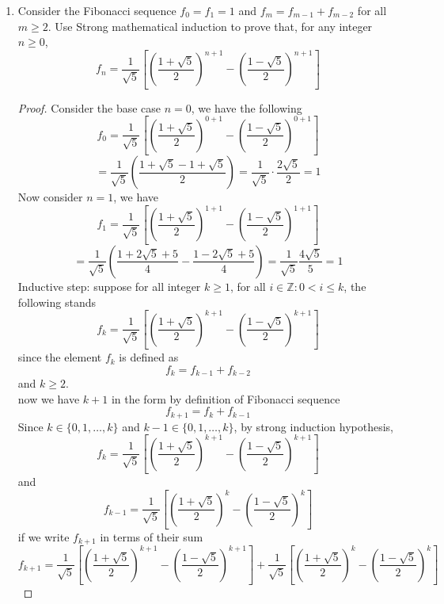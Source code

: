 \documentclass[12pt]{article}
\newcommand{\Z}{\mathbb{Z}}
\newcommand{\sqbkt}[1]{\left[ #1 \right]}
\newcommand{\paren}[1]{\left( #1 \right)}
\begin{document}
\begin{enumerate}
    \item Consider the Fibonacci sequence $f_0 = f_1 = 1$ and $f_m = f_{m-1} + f_{m-2}$ for all $m \geq 2$. Use Strong mathematical induction to prove that, for any integer $n \geq 0$, 
        \[
        f_n = \frac{1}{\sqrt{5}}\sqbkt{\paren{\frac{1+\sqrt{5}}{2}}^{n+1} - \paren{\frac{1-\sqrt{5}}{2}}^{n+1}}
        \]
        \begin{proof}
            Consider the base case $n=0$, we have the following
                \[
                f_0=\frac{1}{\sqrt{5}}\sqbkt{\paren{\frac{1+\sqrt{5}}{2}}^{0+1} - \paren{\frac{1-\sqrt{5}}{2}}^{0+1}} 
                \]
                \[
                = \frac{1}{\sqrt{5}}\paren{\frac{1+\sqrt{5}-1+\sqrt{5}}{2}} = \frac{1}{\sqrt{5}}\cdot\frac{2\sqrt{5}}{2} = 1
                \]
            Now consider $n=1$, we have
                \[
                f_1=\frac{1}{\sqrt{5}}\sqbkt{\paren{\frac{1+\sqrt{5}}{2}}^{1+1} - \paren{\frac{1-\sqrt{5}}{2}}^{1+1}} 
                \]
                \[
                =\frac{1}{\sqrt{5}} \paren{
                \frac{1 + 2\sqrt{5} + 5 }{4}-
                \frac{1 - 2\sqrt{5} + 5 }{4}
                }=\frac{1}{\sqrt{5}}\frac{4\sqrt{5}}{5} = 1
                \]
            Inductive step: suppose for all integer $k \geq 1$, for all $i \in \Z : 0 < i \leq k$, the following stands
                \[
                f_k = \frac{1}{\sqrt{5}}\sqbkt{\paren{\frac{1+\sqrt{5}}{2}}^{k+1} - \paren{\frac{1-\sqrt{5}}{2}}^{k+1}}
                \]
            since the element $f_k$ is defined as
                \[
                f_k = f_{k-1}+ f_{k-2}
                \]
            and $k \geq 2$.\\
            now we have $k+1$ in the form by definition of Fibonacci sequence
                \[
                f_{k+1} = f_{k}+f_{k-1}
                \]
            Since $k \in \{0,1,\ldots,k \}$ and $k-1 \in \{0,1,\ldots,k \}$, by strong induction hypothesis,
                \[
                f_k = \frac{1}{\sqrt{5}}\sqbkt{\paren{\frac{1+\sqrt{5}}{2}}^{k+1} - \paren{\frac{1-\sqrt{5}}{2}}^{k+1}}
                \]
            and
                \[
                f_{k-1} = \frac{1}{\sqrt{5}}\sqbkt{\paren{\frac{1+\sqrt{5}}{2}}^{k} - \paren{\frac{1-\sqrt{5}}{2}}^{k}}
                \]
            if we write $f_{k+1}$ in terms of their sum
                \[
                f_{k+1} = \frac{1}{\sqrt{5}}\sqbkt{\paren{\frac{1+\sqrt{5}}{2}}^{k+1} - \paren{\frac{1-\sqrt{5}}{2}}^{k+1}}
                +
                \frac{1}{\sqrt{5}}\sqbkt{\paren{\frac{1+\sqrt{5}}{2}}^{k} - \paren{\frac{1-\sqrt{5}}{2}}^{k}} 
\]
\end{proof}
\end{enumerate}
\end{document}
